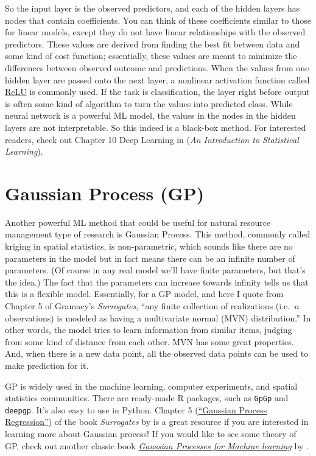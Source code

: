 \documentclass[
]{book}
\begin{document}
So the input layer is the observed predictors, and each of the hidden layers has nodes that contain coefficients. You can think of these coefficients similar to those for linear models, except they do not have linear relationships with the observed predictors. These values are derived from finding the best fit between data and some kind of cost function; essentially, these values are meant to minimize the differences between observed outcome and predictions. When the values from one hidden layer are passed onto the next layer, a nonlinear activation function called \href{https://en.wikipedia.org/wiki/Rectifier_(neural_networks)}{ReLU} is commonly used. If the task is classification, the layer right before output is often some kind of algorithm to turn the values into predicted class. While neural network is a powerful ML model, the values in the nodes in the hidden layers are not interpretable. So this indeed is a black-box method. For interested readers, check out Chapter 10 Deep Learning in \citet{james2013introduction} (\emph{An Introduction to Statistical Learning}).

\hypertarget{gaussian-process-gp}{%
\section{Gaussian Process (GP)}\label{gaussian-process-gp}}

Another powerful ML method that could be useful for natural resource management type of research is Gaussian Process. This method, commonly called kriging in spatial statistics, is non-parametric, which sounds like there are no parameters in the model but in fact means there can be an infinite number of parameters. (Of course in any real model we'll have finite parameters, but that's the idea.) The fact that the parameters can increase towards infinity tells us that this is a flexible model. Essentially, for a GP model, and here I quote from Chapter 5 of Gramacy's \emph{Surrogates}, ``any finite collection of realizations (i.e.~\(n\) observations) is modeled as having a multivariate normal (MVN) distribution.'' In other words, the model tries to learn information from similar items, judging from some kind of distance from each other. MVN has some great properties. And, when there is a new data point, all the observed data points can be used to make prediction for it.

GP is widely used in the machine learning, computer experiments, and spatial statistics communities. There are ready-made R packages, such as \texttt{GpGp} and \texttt{deepgp}. It's also easy to use in Python. Chapter 5 (\href{https://bookdown.org/rbg/surrogates/chap5.html}{``Gaussian Process Regression''}) of the book \emph{Surrogates} by \citet{gramacy2020surrogates} is a great resource if you are interested in learning more about Gaussian process! If you would like to see some theory of GP, check out another classic book \href{https://gaussianprocess.org/gpml/}{\emph{Gaussian Processes for Machine learning}} by \citet{CR2006gp}.
\end{document}
